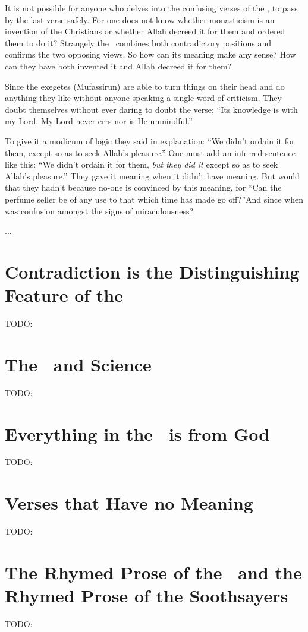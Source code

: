 \documentclass[12pt]{memoir}
\begin{document}
It is not possible for anyone who delves into
the confusing verses of the \Quran, to pass by the last verse safely.
For one does not know whether monasticism is an invention of the Christians
or whether Allah decreed it for them and ordered them to do it?
Strangely the \Quran\ combines both contradictory positions
and confirms the two opposing views.
So how can its meaning make any sense?
How can they have both invented it and Allah decreed it for them?

Since the exegetes (Mufassirun) are able to turn things on their head
and do anything they like without anyone speaking a single word of criticism.
They doubt themselves without ever daring to doubt the verse;
“Its knowledge is with my Lord. My Lord never errs nor is He unmindful.”

To give it a modicum of logic they said in explanation:
“We didn’t ordain it for them, except so as to seek Allah’s pleasure.”
One must add an inferred sentence like this:
“We didn’t ordain it for them,
\emph{but they did it} except so as to seek Allah’s pleasure.”
They gave it meaning when it didn’t have meaning.
But would that they hadn’t because no-one is convinced by this meaning,
for “Can the perfume seller be of any use to
that which time has made go off?”\fnmarksym[*]
And since when was confusion amongst the signs of miraculousness?


...

\section{Contradiction is the Distinguishing Feature of the \Quran}
TODO:
\section{The \Quran\ and Science}
TODO:
\section{Everything in the \Quran\ is from God}
TODO:
\section{Verses that Have no Meaning}
TODO:
\section{The Rhymed Prose of the \Quran\ and
the Rhymed Prose of the Soothsayers}
TODO:
\end{document}
